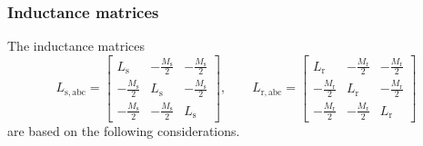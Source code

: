 \begin{frame}
	\frametitle{Inductance matrices}
    The inductance matrices
    $$\renewcommand*{\arraystretch}{1.15} 
    L_\mathrm{s,abc} = \begin{bmatrix}
        L_\mathrm{s} & -\frac{M_\mathrm{s}}{2} & -\frac{M_\mathrm{s}}{2}\\
        -\frac{M_\mathrm{s}}{2} & L_\mathrm{s} & -\frac{M_\mathrm{s}}{2}\\
        -\frac{M_\mathrm{s}}{2} & -\frac{M_\mathrm{s}}{2} & L_\mathrm{s}
    \end{bmatrix}, \qquad  L_\mathrm{r,abc} = \begin{bmatrix}
        L_\mathrm{r} & -\frac{M_\mathrm{r}}{2} & -\frac{M_\mathrm{r}}{2}\\
        -\frac{M_\mathrm{r}}{2} & L_\mathrm{r} & -\frac{M_\mathrm{r}}{2}\\
        -\frac{M_\mathrm{r}}{2} & -\frac{M_\mathrm{r}}{2} & L_\mathrm{r}
    \end{bmatrix}$$
    are based on the following considerations. 
\end{frame}